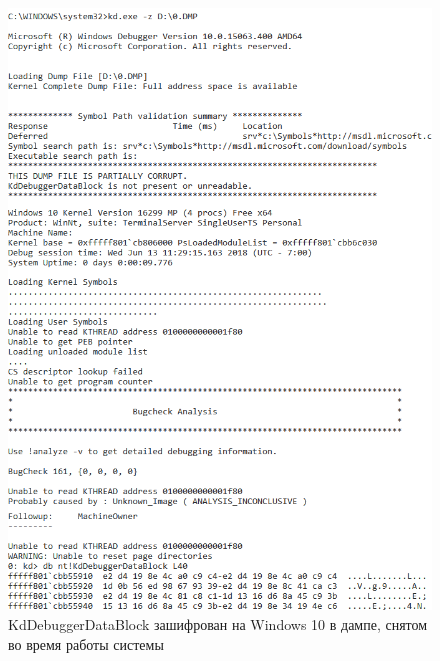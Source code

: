 \documentclass{mipt-thesis-bs}
\begin{document}
\begin{figure}[h]
\begin{center}
    \captionsetup{justification=centering}
    \includegraphics[width=1\textwidth]{kd2.png}
    \caption{KdDebuggerDataBlock зашифрован на Windows 10 в дампе, снятом во время работы системы}
    \label{fig:kd1}
\end{center}
\end{figure}
\end{document}
